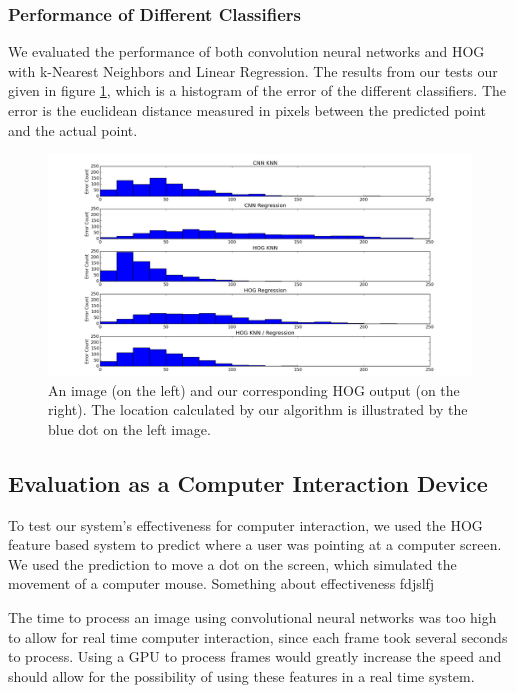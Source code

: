 \documentclass[10pt,twocolumn,letterpaper]{article}
\begin{document}
\subsubsection{Performance of Different Classifiers}
We evaluated the performance of both convolution neural networks and HOG with k-Nearest Neighbors and Linear Regression. The results from our tests our given in figure \ref{fig:hist}, which is a histogram of the error of the different classifiers. The error is the euclidean distance measured in pixels between the predicted point and the actual point.
\begin{figure}
	\begin{center}
		\includegraphics[width=0.9\linewidth]{figures/ClassifierErrorHist.png}
	\end{center}
	\caption{An image (on the left) and our corresponding HOG output (on the right). The location calculated by our algorithm is illustrated by the blue dot on the left image.}
	\label{fig:hist}
\end{figure}
\subsection{Evaluation as a Computer Interaction Device}

To test our system's effectiveness for computer interaction, we used the HOG feature based system to predict where a user was pointing at a computer screen.  We used the prediction to move a dot on the screen, which simulated the movement of a computer mouse.  Something about effectiveness fdjslfj

The time to process an image using convolutional neural networks was too high to allow for real time computer interaction, since each frame took several seconds to process.  Using a GPU to process frames would greatly increase the speed and should allow for the possibility of using these features in a real time system.
\end{document}
